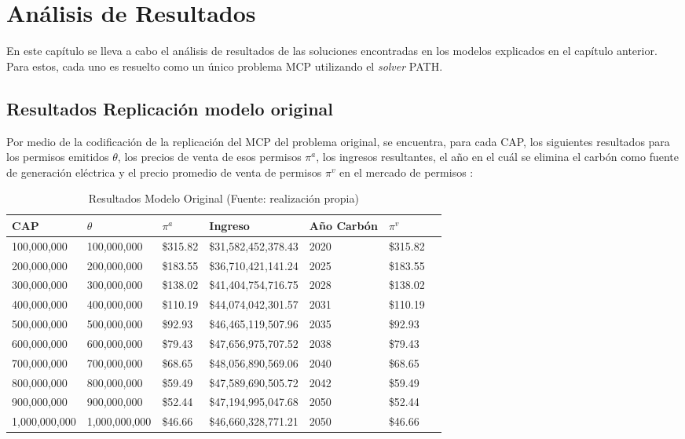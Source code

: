 
\chapter{Análisis de Resultados}
\label{c4} %


En este capítulo se lleva a cabo el análisis de resultados de las soluciones encontradas en los modelos explicados en el capítulo anterior. Para estos, cada uno es resuelto como un único problema MCP utilizando el \textit{solver} PATH.


\section{Resultados Replicación modelo original}\label{replicaciongams}

Por medio de la codificación de la replicación del MCP del problema original, se encuentra, para cada CAP, los siguientes resultados para los permisos emitidos $\theta$, los precios de venta de esos permisos $\pi^a$, los ingresos resultantes, el año en el cuál se elimina el carbón como fuente de generación eléctrica y el precio promedio de venta de permisos $\pi^v$ en el mercado de permisos :

\begin{table}[H]
    \centering
    \begin{tabular}{|l|l|l|l|l|l|l|}
    \hline
        CAP &  $\theta$ & $\pi^a$ & Ingreso &  Año Carbón & $ \pi^v$   \\ \hline
        100,000,000  & 100,000,000  &  \$315.82  &  \$31,582,452,378.43  & 2020 &  \$315.82   \\ \hline
        200,000,000  & 200,000,000  &  \$183.55  &  \$36,710,421,141.24  & 2025 &  \$183.55   \\ \hline
        300,000,000  & 300,000,000  &  \$138.02  &  \$41,404,754,716.75  & 2028 &  \$138.02   \\ \hline
        400,000,000  & 400,000,000  &  \$110.19  &  \$44,074,042,301.57  & 2031 &  \$110.19   \\ \hline
        500,000,000  & 500,000,000  &  \$92.93  &  \$46,465,119,507.96  & 2035 &  \$92.93   \\ \hline
        600,000,000  & 600,000,000  &  \$79.43  &  \$47,656,975,707.52  & 2038 &  \$79.43   \\ \hline
        700,000,000  & 700,000,000  &  \$68.65  &  \$48,056,890,569.06  & 2040 &  \$68.65   \\ \hline
        800,000,000  & 800,000,000  &  \$59.49  &  \$47,589,690,505.72  & 2042 &  \$59.49   \\ \hline
        900,000,000  & 900,000,000  &  \$52.44  &  \$47,194,995,047.68  & 2050 &  \$52.44   \\ \hline
        1,000,000,000  & 1,000,000,000  &  \$46.66  &  \$46,660,328,771.21  & 2050 &  \$46.66   \\ \hline
    \end{tabular}
    \caption{{\footnotesize Resultados Modelo Original (Fuente: realización propia)}}
    \label{resultadosmodelooriginal}
\end{table}


